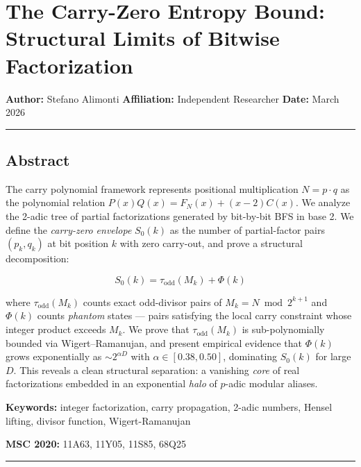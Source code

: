 \documentclass[
  11pt,
]{article}
\author{Stefano Alimonti --- stefalimonti@gmail.com}
\date{March 2026}
\begin{document}
{
\hypersetup{linkcolor=black}
\setcounter{tocdepth}{2}
\tableofcontents
}
\section{The Carry-Zero Entropy Bound: Structural Limits of Bitwise
Factorization}\label{the-carry-zero-entropy-bound-structural-limits-of-bitwise-factorization}

\textbf{Author:} Stefano Alimonti \textbf{Affiliation:} Independent Researcher
\textbf{Date:} March 2026

\begin{center}\rule{0.5\linewidth}{0.5pt}\end{center}

\newpage

\subsection{Abstract}\label{abstract}

The carry polynomial framework represents positional multiplication
\(N = p \cdot q\) as the polynomial relation \(P(x)Q(x) = F_N(x) + (x-2)C(x)\).
We analyze the 2-adic tree of partial factorizations generated by bit-by-bit BFS
in base 2. We define the \emph{carry-zero envelope} \(S_0(k)\) as the number of
partial-factor pairs \((p_k, q_k)\) at bit position \(k\) with zero carry-out,
and prove a structural decomposition:

\[S_0(k) = \tau_{\text{odd}}(M_k) + \Phi(k)\]

where \(\tau_{\text{odd}}(M_k)\) counts exact odd-divisor pairs of
\(M_k = N \bmod 2^{k+1}\) and \(\Phi(k)\) counts \emph{phantom} states --- pairs
satisfying the local carry constraint whose integer product exceeds \(M_k\). We
prove that \(\tau_{\text{odd}}(M_k)\) is sub-polynomially bounded via
Wigert--Ramanujan, and present empirical evidence that \(\Phi(k)\) grows
exponentially as \(\sim 2^{\alpha D}\) with \(\alpha \in [0.38, 0.50]\),
dominating \(S_0(k)\) for large \(D\). This reveals a clean structural
separation: a vanishing \emph{core} of real factorizations embedded in an
exponential \emph{halo} of \(p\)-adic modular aliases.

\textbf{Keywords:} integer factorization, carry propagation, 2-adic numbers,
Hensel lifting, divisor function, Wigert-Ramanujan

\textbf{MSC 2020:} 11A63, 11Y05, 11S85, 68Q25

\begin{center}\rule{0.5\linewidth}{0.5pt}\end{center}
\end{document}
